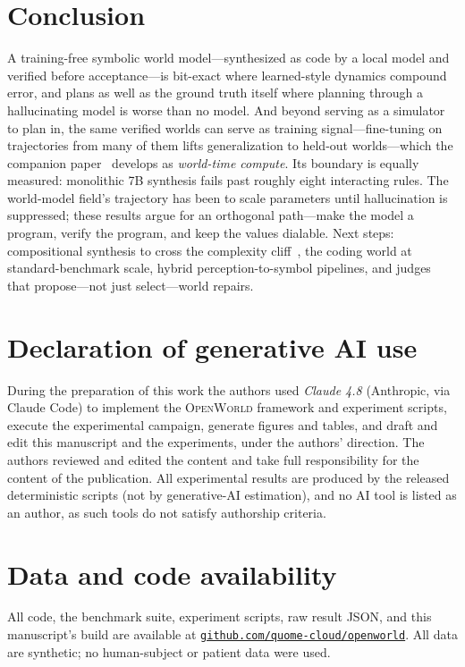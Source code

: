 \documentclass[11pt]{article}
\newcommand{\openworld}{\textsc{OpenWorld}}
\begin{document}
\section{Conclusion}
A training-free symbolic world model---synthesized as code by a local model and verified
before acceptance---is bit-exact where learned-style dynamics compound error, and plans
as well as the ground truth itself where planning through a hallucinating model is
worse than no model. And beyond serving as a simulator to plan in, the same
verified worlds can serve as training signal---fine-tuning on trajectories from many of
them lifts generalization to held-out worlds---which the companion paper~\cite{openworld_wtc}
develops as \emph{world-time compute}. Its boundary is equally measured: monolithic 7B
synthesis fails past roughly eight interacting rules. The world-model field's
trajectory has been to scale parameters until hallucination is suppressed;
these results argue for an orthogonal path---make the model a program, verify
the program, and keep the values dialable. Next steps: compositional
synthesis to cross the complexity cliff~\cite{poeworld2025}, the coding world
at standard-benchmark scale, hybrid perception-to-symbol pipelines, and
judges that propose---not just select---world repairs.

\section*{Declaration of generative AI use}
During the preparation of this work the authors used \emph{Claude 4.8}
(Anthropic, via Claude Code) to implement the \openworld{} framework and
experiment scripts, execute the experimental campaign, generate figures and
tables, and draft and edit this manuscript and the experiments, under the
authors' direction. The authors reviewed and edited the content and
take full responsibility for the content of the publication. All experimental results are produced by the released
deterministic scripts (not by generative-AI estimation), and no AI tool is
listed as an author, as such tools do not satisfy authorship criteria.

\section*{Data and code availability}
All code, the benchmark suite, experiment scripts, raw result JSON, and this
manuscript's build are available at
\href{https://github.com/quome-cloud/openworld}{\nolinkurl{github.com/quome-cloud/openworld}}.
All data are synthetic; no human-subject or patient data were used.
\end{document}
